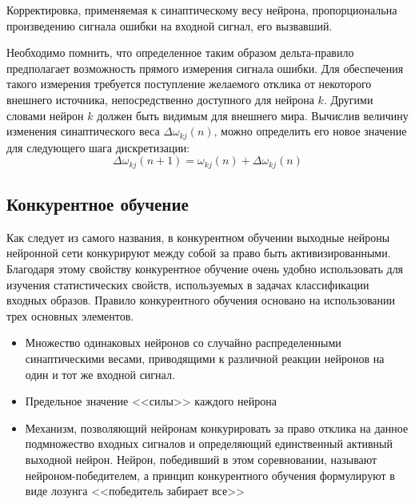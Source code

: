 Корректировка, применяемая к синаптическому весу нейрона, пропорциональна произведению сигнала ошибки на входной сигнал, его вызвавший.

Необходимо помнить, что  определенное таким образом дельта-правило предполагает возможность прямого измерения сигнала ошибки.
Для обеспечения такого измерения требуется поступление желаемого отклика от некоторого внешнего источника, непосредственно доступного для нейрона $k$.
Другими словами нейрон $k$ должен быть видимым для внешнего мира.
Вычислив величину изменения синаптического веса $\Delta\omega_{kj}(n)$, можно определить его новое значение для следующего шага дискретизации:
\begin{equation}
\Delta\omega_{kj}(n+1) = \omega_{kj}(n) +\Delta\omega_{kj}(n)
\end{equation}

\subsection{Конкурентное обучение}

Как следует из самого названия, в конкурентном обучении выходные нейроны нейронной сети конкурируют между собой за право быть активизированными.
Благодаря этому свойству конкурентное обучение очень удобно использовать для изучения статистических свойств, используемых в задачах классификации входных образов. 
Правило конкурентного обучения основано на использовании трех основных элементов.
\begin{itemize}
\item Множество одинаковых нейронов со случайно распределенными синаптическими весами, приводящими к различной реакции нейронов на один и тот же входной сигнал.
\item Предельное значение <<силы>> каждого нейрона
\item Механизм, позволяющий нейронам конкурировать за право отклика на данное подмножество входных сигналов  и определяющий единственный активный выходной нейрон.
Нейрон, победивший в этом соревновании, называют нейроном-победителем, а принцип конкурентного обучения формулируют в виде лозунга <<победитель забирает все>> 
\end{itemize}
